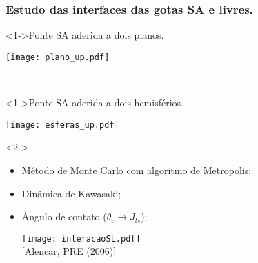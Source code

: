 \documentclass[8pt]{beamer}
\begin{document}
\begin{frame}
\frametitle<1->{Estudo das interfaces das gotas SA e livres.}
		\vspace{-0.2cm}		
		\begin{minipage}{0.47\textwidth}
			\begin{block}<1->{Ponte SA aderida a dois planos.}
				\begin{center}
					\texttt{[image: plano\_up.pdf]}
				\end{center}		
			\end{block}
		\end{minipage}
		~~~~	
		\begin{minipage}{0.47\textwidth}
			\begin{block}<1->{Ponte SA aderida a dois hemisférios.}
				\begin{center}
				       \texttt{[image: esferas\_up.pdf]}\\
				\end{center}
			\end{block}
		\end{minipage}
		\vspace{-0.2cm}		
		\begin{block}<2->{}
			\begin{minipage}{0.45\textwidth}
			\end{minipage}		
			\begin{minipage}{0.5\textwidth}
					\begin{itemize}
					    \item<3->  Método de Monte Carlo com algoritmo de Metropolis;
						\item<3->  Dinâmica de Kawasaki;
						\item<3->  Ângulo de contato ($\theta_c\rightarrow J_{ls}$);
						\begin{flushleft}
							\begin{center}
							\texttt{[image: interacaoSL.pdf]}\\
							{\footnotesize [Alencar, PRE ($2006$)]}
							\end{center}
						\end{flushleft}
					\end{itemize}
			\end{minipage}
		\end{block}		
\end{frame}
\end{document}
